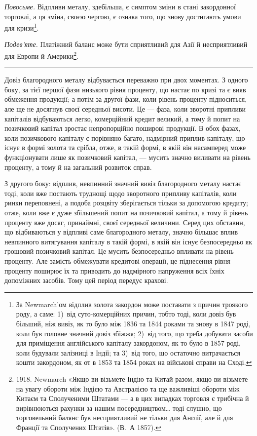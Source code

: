 
\emph{Повосьме.} Відпливи металу, здебільша, є симптом зміни в стані закордонної
торговлі, а ця зміна, своєю чергою, є ознака того, що знову достигають
умови для кризи\footnote{
За Newmarch’ом відплив золота закордон може поставати з причин троякого роду, а саме:
1)~від суто-комерційних причин, тобто тоді, коли довіз був більший, ніж вивіз, як то було між 1836
та 1844 роками та знову в 1847 роді, коли був головне значний довіз збіжжя; 2)~від того, що треба
добувати засоби для приміщення англійського капіталу закордоном, як то було в 1857 роді, коли
будували
залізниці в Індії; та 3)~від того, що остаточно витрачається кошти закордоном, як от в 1853
та 1854 роках на військові справи на Сході.
}.

\emph{Подев’яте.} Платіжний баланс може бути сприятливий для Азії й несприятливий
для Европи й Америки\footnote{
1918. Newmarch «Якщо ви візьмете Індію та Китай разом, якщо ви візьмете на увагу
обороти між Індією та Австралією та ще важливіші обороти між Китаєм та Сполученими Штатами — а в
цих випадках торговля є трибічна й вирівнюються рахунки за нашим посередництвом\dots{} тоді слушно,
що торговельний балянс був несприятливий не тільки для Англії, але й для Франції та Сполучених
Штатів». (В.~А 1857).
}.

\plainbreak{2}

Довіз благородного металу відбувається переважно при двох моментах.
З одного боку, за тієї першої фази низького рівня проценту, що настає по
кризі та є вияв обмеження продукції; а потім за другої фази, коли рівень проценту
підноситься, але ще не досягнув своєї середньої висоти. Це — фаза, коли
зворотні припливи капіталів відбуваються легко, комерційний кредит великий,
а тому й попит на позичковий капітал зростає непропорційно поширові продукції.
В обох фазах, коли позичкового капіталу є порівняно багато, надмірний
приплив капіталу, що існує в формі золота та срібла, отже, в такій формі,
в якій він насамперед може функціонувати лише як позичковий капітал, — мусить
значно виливати на рівень проценту, а тому й на загальний розвиток справ.

З другого боку: відплив, невпинний значний вивіз благородного металу
настає тоді, коли вже постають труднощі щодо зворотного припливу капіталів,
коли ринки переповнені, а подоба розцвіту зберігається тільки за допомогою
кредиту; отже, коли вже є дуже збільшений попит на позичковий капітал, а тому
й рівень проценту вже досяг, принаймні, своєї середньої величини. Серед цих
обставин, що відбиваються у відпливі саме благородного металу, значно більшає
вплив невпинного витягування капіталу в такій формі, в якій він існує безпосередньо
як грошовий позичковий капітал. Це мусить безпосередньо впливати
на рівень проценту. Але замість обмежувати кредитові операції, це піднесення
рівня проценту поширює їх та приводить до надмірного напруження всіх їхніх
допоміжних засобів. Тому цей період передує крахові.

